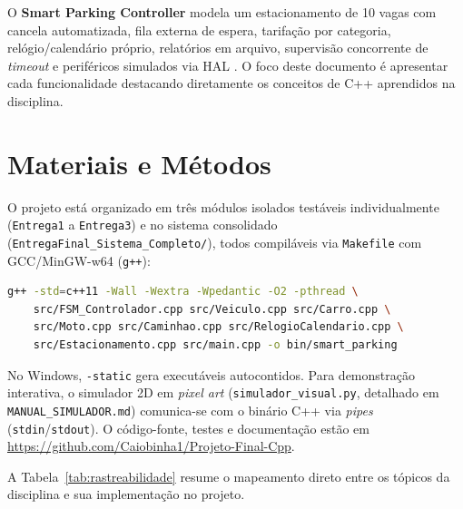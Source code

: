 \documentclass[10pt,twocolumn,a4paper]{article}
\newcommand{\code}[1]{\texttt{\footnotesize #1}}
\begin{document}
O \textbf{Smart Parking Controller} modela um estacionamento de 10 vagas com cancela automatizada, fila externa de espera, tarifação por categoria, relógio/calendário próprio, relatórios em arquivo, supervisão concorrente de \textit{timeout} e periféricos simulados via HAL \cite{bezerra2026eel7323}. O foco deste documento é apresentar cada funcionalidade destacando diretamente os conceitos de C++ aprendidos na disciplina.

\section{Materiais e Métodos}

O projeto está organizado em três módulos isolados testáveis individualmente (\code{Entrega1} a \code{Entrega3}) e no sistema consolidado (\code{EntregaFinal\_Sistema\_Completo/}), todos compiláveis via \code{Makefile} com GCC/MinGW-w64 (\code{g++}):

\begin{lstlisting}[language=bash, numbers=none, float=ht, caption={Compilação do sistema completo (Linux/Windows).}]
g++ -std=c++11 -Wall -Wextra -Wpedantic -O2 -pthread \
    src/FSM_Controlador.cpp src/Veiculo.cpp src/Carro.cpp \
    src/Moto.cpp src/Caminhao.cpp src/RelogioCalendario.cpp \
    src/Estacionamento.cpp src/main.cpp -o bin/smart_parking
\end{lstlisting}

No Windows, \code{-static} gera executáveis autocontidos. Para demonstração interativa, o simulador 2D em \textit{pixel art} (\code{simulador\_visual.py}, detalhado em \code{MANUAL\_SIMULADOR.md}) comunica-se com o binário C++ via \textit{pipes} (\code{stdin}/\code{stdout}). O código-fonte, testes e documentação estão em \url{https://github.com/Caiobinha1/Projeto-Final-Cpp}.

A Tabela~\ref{tab:rastreabilidade} resume o mapeamento direto entre os tópicos da disciplina e sua implementação no projeto.
\end{document}
